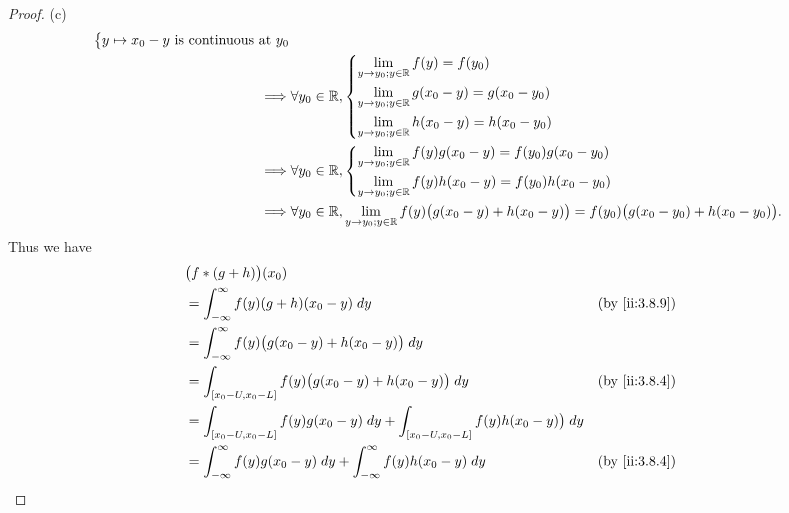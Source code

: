 \begin{proof}{(c)}
\begin{align*}
\begin{dcases}
                                     y \mapsto x_0 - y \text{ is continuous at } y_0
                                   \end{dcases}                                                                     \\
    \implies & \forall y_0 \in \mathbb{R}, \begin{dcases}
                                     \lim_{y \to y_0 ; y \in \mathbb{R}} f(y) = f(y_0)             \\
                                     \lim_{y \to y_0 ; y \in \mathbb{R}} g(x_0 - y) = g(x_0 - y_0) \\
                                     \lim_{y \to y_0 ; y \in \mathbb{R}} h(x_0 - y) = h(x_0 - y_0)
                                   \end{dcases}                                                              \\
    \implies & \forall y_0 \in \mathbb{R}, \begin{dcases}
                                     \lim_{y \to y_0 ; y \in \mathbb{R}} f(y) g(x_0 - y) = f(y_0) g(x_0 - y_0) \\
                                     \lim_{y \to y_0 ; y \in \mathbb{R}} f(y) h(x_0 - y) = f(y_0) h(x_0 - y_0)
                                   \end{dcases}                                                  \\
    \implies & \forall y_0 \in \mathbb{R}, \lim_{y \to y_0 ; y \in \mathbb{R}} f(y) \big(g(x_0 - y) + h(x_0 - y)\big) = f(y_0) \big(g(x_0 - y_0) + h(x_0 - y_0)\big).
  \end{align*}
  Thus we have
  \begin{align*}
     & \big(f * (g + h)\big)(x_0)                                                                                                  \\
     & = \int_{-\infty}^\infty f(y) (g + h)(x_0 - y) \; dy                                                      &  & \by{ii:3.8.9} \\
     & = \int_{-\infty}^\infty f(y) \big(g(x_0 - y) + h(x_0 - y)\big) \; dy                                                        \\
     & = \int_{[x_0 - U, x_0 - L]} f(y) \big(g(x_0 - y) + h(x_0 - y)\big) \; dy                                 &  & \by{ii:3.8.4} \\
     & = \int_{[x_0 - U, x_0 - L]} f(y) g(x_0 - y) \; dy + \int_{[x_0 - U, x_0 - L]} f(y) h(x_0 - y)\big) \; dy                    \\
     & = \int_{-\infty}^\infty f(y) g(x_0 - y) \; dy + \int_{-\infty}^\infty f(y) h(x_0 - y) \; dy              &  & \by{ii:3.8.4} \\

\end{align*}
\end{proof}
